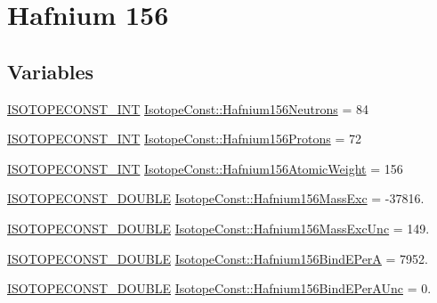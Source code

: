 \hypertarget{group___isotope_const-_hafnium-_hf156}{}\section{Hafnium 156}
\label{group___isotope_const-_hafnium-_hf156}
\subsection*{Variables}
\begin{DoxyCompactItemize}
\item 
\mbox{\hyperlink{group___isotope_const-_macros_ga5f18360b3e99483a35c32d789e62621c}{I\+S\+O\+T\+O\+P\+E\+C\+O\+N\+S\+T\+\_\+\+I\+NT}} \mbox{\hyperlink{group___isotope_const-_hafnium-_hf156_ga6ff602e2ea59d226436bb1c5804735f0}{Isotope\+Const\+::\+Hafnium156\+Neutrons}} = 84
\item 
\mbox{\hyperlink{group___isotope_const-_macros_ga5f18360b3e99483a35c32d789e62621c}{I\+S\+O\+T\+O\+P\+E\+C\+O\+N\+S\+T\+\_\+\+I\+NT}} \mbox{\hyperlink{group___isotope_const-_hafnium-_hf156_ga418690baa65bfd5ecd5c663655f0558d}{Isotope\+Const\+::\+Hafnium156\+Protons}} = 72
\item 
\mbox{\hyperlink{group___isotope_const-_macros_ga5f18360b3e99483a35c32d789e62621c}{I\+S\+O\+T\+O\+P\+E\+C\+O\+N\+S\+T\+\_\+\+I\+NT}} \mbox{\hyperlink{group___isotope_const-_hafnium-_hf156_ga7843b2ddef5f94e0613e98ee132fccab}{Isotope\+Const\+::\+Hafnium156\+Atomic\+Weight}} = 156
\item 
\mbox{\hyperlink{group___isotope_const-_macros_ga8f45a7272ce02c0b4c65c44636ed719a}{I\+S\+O\+T\+O\+P\+E\+C\+O\+N\+S\+T\+\_\+\+D\+O\+U\+B\+LE}} \mbox{\hyperlink{group___isotope_const-_hafnium-_hf156_ga31fd2c477745d53cbe007ffbcf03faa8}{Isotope\+Const\+::\+Hafnium156\+Mass\+Exc}} = -\/37816.
\item 
\mbox{\hyperlink{group___isotope_const-_macros_ga8f45a7272ce02c0b4c65c44636ed719a}{I\+S\+O\+T\+O\+P\+E\+C\+O\+N\+S\+T\+\_\+\+D\+O\+U\+B\+LE}} \mbox{\hyperlink{group___isotope_const-_hafnium-_hf156_gac5d9228caf2933958f4c7b875d97c975}{Isotope\+Const\+::\+Hafnium156\+Mass\+Exc\+Unc}} = 149.
\item 
\mbox{\hyperlink{group___isotope_const-_macros_ga8f45a7272ce02c0b4c65c44636ed719a}{I\+S\+O\+T\+O\+P\+E\+C\+O\+N\+S\+T\+\_\+\+D\+O\+U\+B\+LE}} \mbox{\hyperlink{group___isotope_const-_hafnium-_hf156_ga0579899888c1aa5cf88d46f23c2d3603}{Isotope\+Const\+::\+Hafnium156\+Bind\+E\+PerA}} = 7952.
\item 
\mbox{\hyperlink{group___isotope_const-_macros_ga8f45a7272ce02c0b4c65c44636ed719a}{I\+S\+O\+T\+O\+P\+E\+C\+O\+N\+S\+T\+\_\+\+D\+O\+U\+B\+LE}} \mbox{\hyperlink{group___isotope_const-_hafnium-_hf156_ga59bc47c1857d6c9f961d9fd6d5e2113b}{Isotope\+Const\+::\+Hafnium156\+Bind\+E\+Per\+A\+Unc}} = 0.

\end{DoxyCompactItemize}
